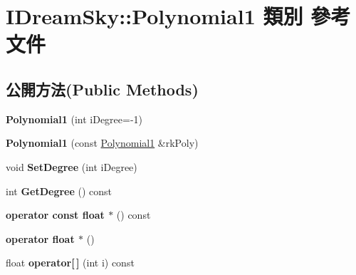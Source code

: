 \hypertarget{class_i_dream_sky_1_1_polynomial1}{}\section{I\+Dream\+Sky\+:\+:Polynomial1 類別 參考文件}
\label{class_i_dream_sky_1_1_polynomial1}
\subsection*{公開方法(Public Methods)}
\begin{DoxyCompactItemize}
\item 
{\bfseries Polynomial1} (int i\+Degree=-\/1)\hypertarget{class_i_dream_sky_1_1_polynomial1_a4b37f8b12a59cda7aa07f66616a0478c}{}\label{class_i_dream_sky_1_1_polynomial1_a4b37f8b12a59cda7aa07f66616a0478c}

\item 
{\bfseries Polynomial1} (const \hyperlink{class_i_dream_sky_1_1_polynomial1}{Polynomial1} \&rk\+Poly)\hypertarget{class_i_dream_sky_1_1_polynomial1_ac32d90416220d9fd26b91f35fb75fa66}{}\label{class_i_dream_sky_1_1_polynomial1_ac32d90416220d9fd26b91f35fb75fa66}

\item 
void {\bfseries Set\+Degree} (int i\+Degree)\hypertarget{class_i_dream_sky_1_1_polynomial1_a3a7a2f569923ed30b53582362fdc87e2}{}\label{class_i_dream_sky_1_1_polynomial1_a3a7a2f569923ed30b53582362fdc87e2}

\item 
int {\bfseries Get\+Degree} () const \hypertarget{class_i_dream_sky_1_1_polynomial1_aeef2989f6c94c9b80c4757c00a4d0280}{}\label{class_i_dream_sky_1_1_polynomial1_aeef2989f6c94c9b80c4757c00a4d0280}

\item 
{\bfseries operator const float $\ast$} () const \hypertarget{class_i_dream_sky_1_1_polynomial1_a42f23e45ef36399777fcd9b099b94825}{}\label{class_i_dream_sky_1_1_polynomial1_a42f23e45ef36399777fcd9b099b94825}

\item 
{\bfseries operator float $\ast$} ()\hypertarget{class_i_dream_sky_1_1_polynomial1_a217bc1fa7f09c168ad1a58bfbb45c23e}{}\label{class_i_dream_sky_1_1_polynomial1_a217bc1fa7f09c168ad1a58bfbb45c23e}

\item 
float {\bfseries operator\mbox{[}$\,$\mbox{]}} (int i) const \hypertarget{class_i_dream_sky_1_1_polynomial1_a731874d6d9b4d3d6f9869d9c1f821477}{}\label{class_i_dream_sky_1_1_polynomial1_a731874d6d9b4d3d6f9869d9c1f821477}


\end{DoxyCompactItemize}
